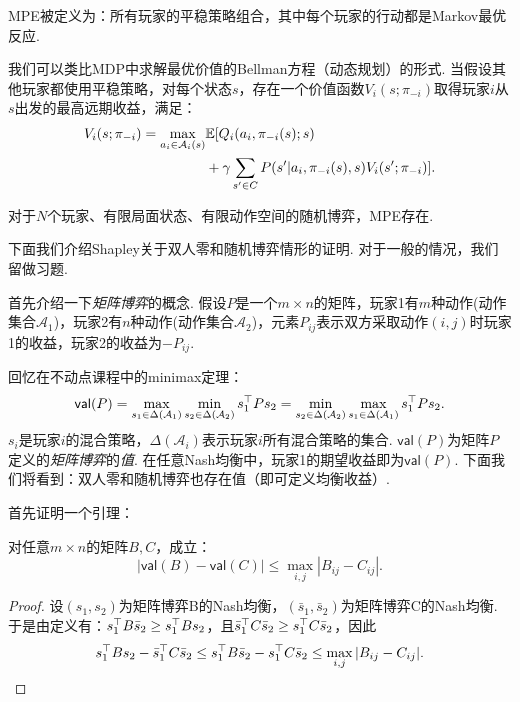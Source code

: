 MPE被定义为：所有玩家的平稳策略组合，其中每个玩家的行动都是Markov最优反应. 

我们可以类比MDP中求解最优价值的Bellman方程（动态规划）的形式. 当假设其他玩家都使用平稳策略，对每个状态$s$，存在一个价值函数$V_i(s;\pi_{-i})$取得玩家$i$从$s$出发的最高远期收益，满足：
\begin{align*}
    V_i(s;\pi_{-i}) = \max_{a_i\in \mathcal A_i(s)}&\mathbb{E}[Q_i(a_i,\pi_{-i}(s);s) \\ &+ \gamma \sum_{s'\in C}P(s'|a_i,\pi_{-i}(s),s)V_i(s';\pi_{-i})].
\end{align*}

\begin{theorem}
    对于$N$个玩家、有限局面状态、有限动作空间的随机博弈，MPE存在.
\end{theorem}

下面我们介绍Shapley关于双人零和随机博弈情形的证明. 对于一般的情况，我们留做习题.

\newcommand{\val}{\mathsf{val}}
首先介绍一下\emph{矩阵博弈}的概念. 假设$P$是一个$m\times n$的矩阵，玩家1有$m$种动作(动作集合$\mathcal A_1$)，玩家2有$n$种动作(动作集合$\mathcal A_2$)，元素$P_{ij}$表示双方采取动作$(i,j)$时玩家1的收益，玩家2的收益为$-P_{ij}$. 

回忆在不动点课程中的minimax定理：
\[\val(P)=\max_{s_1\in \Delta(\mathcal A_1)}\min_{s_2\in\Delta(\mathcal A_2)}s_1^\T Ps_2=\min_{s_2\in \Delta(\mathcal A_2)}\max_{s_1\in\Delta(\mathcal A_1)}s_1^\T Ps_2.\]
$s_i$是玩家$i$的混合策略，$\Delta(\mathcal A_i)$表示玩家$i$所有混合策略的集合. $\val(P)$为矩阵$P$定义的\emph{矩阵博弈}的\emph{值}. 在任意Nash均衡中，玩家1的期望收益即为$\val(P)$. 下面我们将看到：双人零和随机博弈也存在值（即可定义均衡收益）.

首先证明一个引理：
\begin{lemma}\label{lemma:matrix}
    对任意$m\times n$的矩阵$B,C$，成立：
    \[|\val(B)-\val(C)| \le \max_{i,j}|B_{ij} - C_{ij}|.\]
\end{lemma}

\begin{proof}
    设$(s_1,s_2)$为矩阵博弈B的Nash均衡，$(\bar{s}_1,\bar{s}_2)$为矩阵博弈C的Nash均衡. 于是由定义有：$s_1^\top B\bar{s}_2  \ge s_1^\top  B s_2$，且$\bar{s}_1 ^\top  C\bar{s}_2 \ge s_1^\top  C \bar{s}_2 $，因此
    \[s_1^\top  B s_2 - \bar{s}_1 ^\top  C\bar{s}_2  \le s_1^\top  B\bar{s}_2  - s_1^\top  C \bar{s}_2  \le \max_{i,j}|B_{ij} - C_{ij}|.\]
\end{proof}

